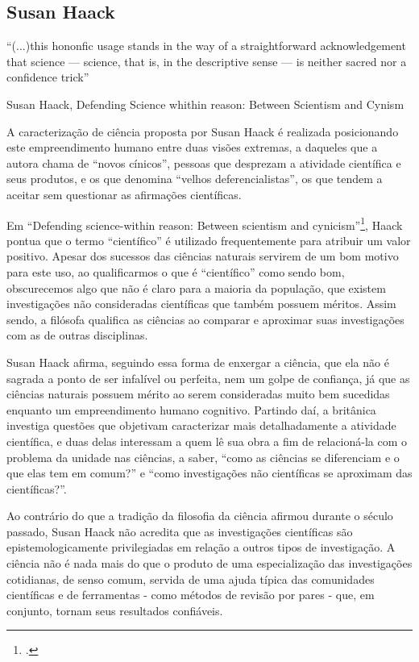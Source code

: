 \documentclass[12pt]{report}
\begin{document}
	\subsection{Susan Haack}
	
		\epigraph{``(...)this hononfic usage
			stands in the way of a straightforward acknowledgement
			that science — science, that is, in the descriptive sense — is
			neither sacred nor a confidence trick''}{Susan Haack, Defending Science whithin reason: Between Scientism and Cynism}
	
		A caracterização de ciência proposta por Susan Haack é realizada posicionando este empreendimento humano entre duas visões extremas, a daqueles que a autora chama de ``novos cínicos'', pessoas que desprezam a atividade científica e seus produtos, e os que denomina ``velhos deferencialistas'', os que tendem a aceitar sem questionar as afirmações científicas. 
		
		Em ``Defending science-within reason: Between scientism and cynicism''\footcite{haack-defending-science}, Haack pontua que o termo ``científico'' é utilizado frequentemente para atribuir um valor positivo.
		Apesar dos sucessos das ciências naturais servirem de um bom motivo para este uso, ao qualificarmos o que é ``científico'' como sendo bom, obscurecemos algo que não é claro para a maioria da população, que existem investigações não consideradas científicas que também possuem méritos.
		Assim sendo, a filósofa qualifica as ciências ao comparar e aproximar suas investigações com as de outras disciplinas.
	
		Susan Haack afirma, seguindo essa forma de enxergar a ciência, que ela não é sagrada a ponto de ser infalível ou perfeita, nem um golpe de confiança, já que as ciências naturais possuem mérito ao serem consideradas muito bem sucedidas enquanto um empreendimento humano cognitivo.
		Partindo daí, a britânica investiga questões que objetivam caracterizar mais detalhadamente a atividade científica, e duas delas interessam a quem lê sua obra a fim de relacioná-la com o problema da unidade nas ciências, a saber, ``como as ciências se diferenciam e o que elas tem em comum?'' e ``como investigações não científicas se aproximam das científicas?''.
	
		Ao contrário do que a tradição da filosofia da ciência afirmou durante o século passado, Susan Haack não acredita que as investigações científicas são epistemologicamente privilegiadas em relação a outros tipos de investigação.
		A ciência não é nada mais do que o produto de uma especialização das investigações cotidianas, de senso comum, servida de uma ajuda típica das comunidades científicas e de ferramentas - como métodos de revisão por pares - que, em conjunto, tornam seus resultados confiáveis.
		
\end{document}
